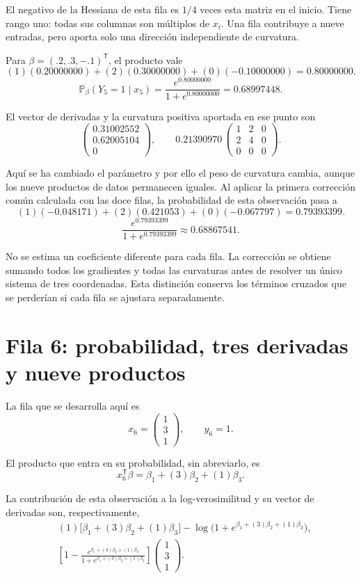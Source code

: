 \documentclass[11pt,a4paper]{article}
\newcommand{\Prob}{\mathbb P}
\newcommand{\T}{^{\mathsf T}}
\begin{document}
El negativo de la Hessiana de esta fila es \(1/4\)
veces esta matriz en el inicio. Tiene rango uno:
todas sus columnas son múltiplos de \(x_i\).
Una fila contribuye a nueve entradas, pero aporta
solo una dirección independiente de curvatura.

Para \(\beta=(.2,.3,-.1)\T\), el producto vale
\[
(1)(0.20000000)+(2)(0.30000000)+(0)(-0.10000000)=0.80000000.
\]
\[
\Prob_\beta(Y_{5}=1\mid x_{5})=\frac{e^{0.80000000}}{1+e^{0.80000000}}=0.68997448.
\]

El vector de derivadas y la curvatura positiva aportada
en ese punto son
\[
\begin{pmatrix}0.31002552\\0.62005104\\0\end{pmatrix},\qquad 0.21390970\,\begin{pmatrix}1&2&0\\2&4&0\\0&0&0\end{pmatrix}.
\]

Aquí se ha cambiado el parámetro y por ello el peso de
curvatura cambia, aunque los nueve productos de datos
permanecen iguales.
Al aplicar la primera corrección común calculada con las doce filas,
la probabilidad de esta observación pasa a
\[
(1)(-0.048171)+(2)(0.421053)+(0)(-0.067797)=0.79393399.
\]
\[
\frac{e^{0.79393399}}{1+e^{0.79393399}}\approx0.68867541.
\]

No se estima un coeficiente diferente para cada fila.
La corrección se obtiene sumando todos los gradientes y todas
las curvaturas antes de resolver un único sistema de tres coordenadas.
Esta distinción conserva los términos cruzados que se perderían
si cada fila se ajustara separadamente.

\clearpage
\section{Fila 6: probabilidad, tres derivadas y nueve productos}\label{logit88}
La fila que se desarrolla aquí es
\[
x_{6}=\begin{pmatrix}1\\3\\1\end{pmatrix},\qquad y_{6}=1.
\]

El producto que entra en su probabilidad, sin abreviarlo, es
\[
x_{6}\T\beta=\beta_1+(3)\beta_2+(1)\beta_3.
\]

La contribución de esta observación a la log-verosimilitud
y su vector de derivadas son, respectivamente,
\[
\begin{aligned}
&(1)\bigl[\beta_1+(3)\beta_2+(1)\beta_3\bigr]-\log\bigl(1+e^{\beta_1+(3)\beta_2+(1)\beta_3}\bigr),\\&\left[1-\frac{e^{\beta_1+(3)\beta_2+(1)\beta_3}}{1+e^{\beta_1+(3)\beta_2+(1)\beta_3}}\right]\begin{pmatrix}1\\3\\1\end{pmatrix}.\end{aligned}
\]
\end{document}
